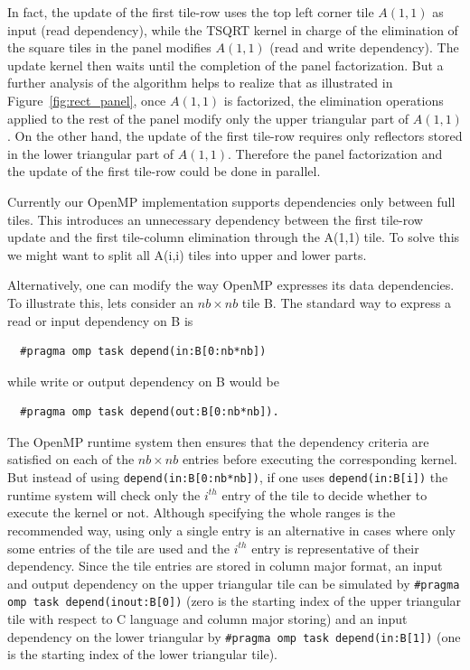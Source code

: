 In fact, the update of the first tile-row uses the top
left corner tile $A(1,1)$ as input (read dependency), while the TSQRT
kernel in charge of the elimination of the square tiles in the panel
modifies $A(1,1)$ (read and write dependency). The update kernel then
waits until the completion of the panel factorization. But a further
analysis of the algorithm helps to realize that as illustrated in
Figure~\ref{fig:rect_panel}, once $A(1,1)$ is factorized, the
elimination operations applied to the rest of the panel modify only
the upper triangular part of $A(1,1)$. On the other hand, the update
of the first tile-row requires only reflectors stored in the lower
triangular part of $A(1,1)$.
Therefore the panel factorization and the update of
the first tile-row could be done in parallel.

Currently our OpenMP implementation supports dependencies only
between full tiles.
This introduces an unnecessary dependency between
the first tile-row update and the first tile-column
elimination through the A(1,1) tile.
To solve this we might want to
split all A(i,i) tiles into upper and lower parts.

Alternatively, one can modify the way OpenMP expresses
its data dependencies.
To illustrate this, lets consider an $nb \times nb$ tile B.
The standard way to express a read or input dependency on B is
\begin{lstlisting}
  #pragma omp task depend(in:B[0:nb*nb])
\end{lstlisting}
while write or output dependency on B would be
\begin{lstlisting}
  #pragma omp task depend(out:B[0:nb*nb]).
\end{lstlisting}

The OpenMP runtime system then ensures that the dependency criteria
are satisfied on each of the $nb \times nb$ entries before executing
the corresponding kernel. But instead of using
\texttt{depend(in:B[0:nb*nb])}, if one uses \texttt{depend(in:B[i])}
the runtime system will check only the $i^{th}$ entry of the tile to
decide whether to execute the kernel or not. Although specifying the
whole ranges is the recommended way, using only a single entry is an
alternative in cases where only some entries of the tile are used and
the $i^{th}$ entry is representative of their dependency. Since the
tile entries are stored in column major format, an input and output
dependency on the upper triangular tile can be simulated by
\texttt{\#pragma omp task depend(inout:B[0])} (zero is the starting
index of the upper triangular tile with respect to C language and
column major storing) and an input dependency on the
lower triangular by \texttt{\#pragma omp task depend(in:B[1])} (one is
the starting index of the lower triangular tile).

